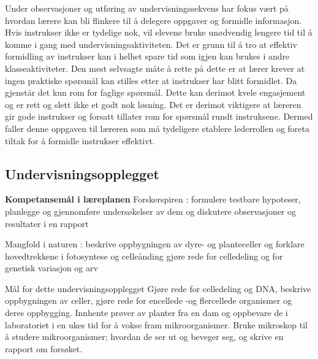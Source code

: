 \documentclass[main.tex]{subfiles}
\begin{document}
Under observasjoner og 
utføring av undervisningssekvens har fokus vært på hvordan 
lærere kan bli flinkere til å delegere oppgaver og formidle 
informasjon. Hvis instrukser ikke er tydelige nok, vil elevene bruke unødvendig 
lengere tid til å komme i gang med undervisningsaktiviteten. Det 
er grunn til å tro at effektiv formidling av instrukser kan i 
helhet spare tid som igjen kan brukes i andre klasseaktiviteter. Den mest selvsagte måte
å rette på dette er at lærer krever at ingen praktiske
spørsmål kan stilles etter at instrukser har blitt formidlet. Da gjenstår
det kun rom for faglige spørsmål. Dette kan derimot kvele engasjement og er
rett og slett ikke et godt nok løsning. Det er derimot viktigere at læreren
gir gode instrukser og forsatt tillater rom for spørsmål rundt instruksene.
Dermed faller denne oppgaven til læreren som må tydeligere
etablere lederrollen og foreta tiltak for å formidle instrukser 
effektivt.

\subsection*{Undervisningsopplegget}
\textbf{Kompetansemål i læreplanen}
\newline
Forskerspiren :
\newline
formulere testbare hypoteser, planlegge og gjennomføre undersøkelser av dem og diskutere observasjoner og 
resultater i en rapport
\newline

Mangfold i naturen :
\newline
beskrive oppbygningen av dyre- og planteceller og forklare hovedtrekkene i fotosyntese og celleånding
gjøre rede for celledeling og for genetisk variasjon og arv
\newline

Mål for dette undervisningsopplegget 
\newline
Gjøre rede for celledeling og DNA, beskrive oppbygningen av celler, gjøre rede for encellede -og flercellede organismer
og deres oppbygging. Innhente prøver av planter fra en dam og oppbevare de i laboratoriet i en ukes tid for å vokse 
fram mikroorganismer. Bruke mikroskop til å studere mikroorganismer; hvordan de ser ut og beveger seg, og skrive en 
rapport om forsøket.
\end{document}
